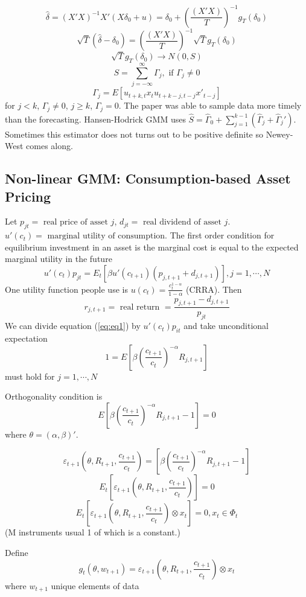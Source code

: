 \documentclass[11pt, a4paper, oneside]{article}
\theoremstyle{definition}
\theoremstyle{proposition}
\theoremstyle{corollary}
\theoremstyle{lemma}
\theoremstyle{theorem}
\begin{document}
$$\hat{\delta} = (X'X)^{-1}X'(X\delta_0 + u) = \delta_0 +\left(\frac{(X'X)}{T}\right)^{-1} g_T(\delta_0)$$
$$\sqrt{T}(\hat{\delta}- \delta_0) = \left(\frac{(X'X)}{T}\right)^{-1} \sqrt{T}g_T(\delta_0)$$
$$\sqrt{T} g_T(\delta_0) \to N(0, S)$$ 
$$S = \sum_{j = -\infty}^{\infty} \Gamma_j, \text{ if } \Gamma_j \neq 0$$
$$\Gamma_j = E[ u_{t+k, t}x_t u_{t+k-j, t-j}x'_{t-j}]$$
for $j < k$, $\Gamma_j \neq 0$, $j \geq k$, $\Gamma_j = 0$. The paper was able to sample data more timely than the forecasting. Hansen-Hodrick GMM uses $\hat{S} = \hat{\Gamma}_0 + \sum_{j=1}^{k-1}(\hat{\Gamma}_j + \hat{\Gamma}_j')$. Sometimes this estimator does not turns out to be positive definite so Newey-West comes along. 

\subsection{Non-linear GMM: Consumption-based Asset Pricing}
Let $p_{jt} = \text{ real price of asset } j$, $d_{jt} = \text{ real dividend of asset } j$. $u'(c_t) =\text{ marginal utility of consumption}$. The first order condition for equilibrium investment in an asset is the marginal cost is equal to the expected marginal utility in the future 
\begin{equation}\label{eq:eq1}
u'(c_t)p_{jt} = E_t[\beta u'(c_{t+1})(p_{j,t+1} + d_{j, t+1})], j = 1, \cdots ,N
\end{equation}
One utility function people use is $u(c_t) = \frac{c_t^{1-\alpha}}{1-\alpha}$ (CRRA). Then 
$$r_{j, t+1} = \text{ real return } = \frac{p_{j, t+1} - d_{j, t+1}}{p_{jt}}$$
We can divide equation (\ref{eq:eq1}) by $u'(c_t)p_{it}$ and take unconditional expectation
$$1 = E\left[\beta\left(\frac{c_{t+1}}{c_t}\right)^{-\alpha}R_{j, t+1}\right]$$ must hold for $j = 1, \cdots, N$

Orthogonality condition is 
$$ E\left[\beta\left(\frac{c_{t+1}}{c_t}\right)^{-\alpha}R_{j, t+1}-1\right]= 0$$
where $\theta = (\alpha, \beta)'$. 

$$\varepsilon_{t+1}\left(\theta, R_{t+1}, \frac{c_{t+1}}{c_t}\right) =\left[\beta\left(\frac{c_{t+1}}{c_t}\right)^{-\alpha}R_{j, t+1}-1\right]$$
$$E_t\left[\varepsilon_{t+1}\left(\theta, R_{t+1}, \frac{c_{t+1}}{c_t}\right)\right] = 0$$
$$E_t\left[\varepsilon_{t+1}\left(\theta, R_{t+1}, \frac{c_{t+1}}{c_t}\right) \otimes x_t\right] = 0, x_t \in \Phi_t$$
(M instruments usual 1 of which is a constant.)

Define $$g_t(\theta, w_{t+1}) = \varepsilon_{t+1}\left(\theta, R_{t+1}, \frac{c_{t+1}}{c_t}\right) \otimes x_t$$
where $w_{t+1}$ unique elements of data
\end{document}
